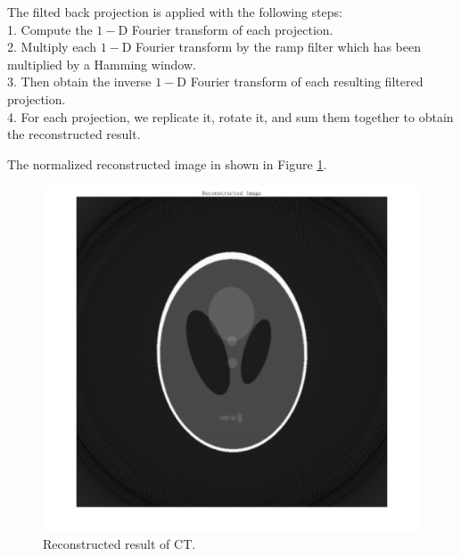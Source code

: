 The filted back projection is applied with the following steps: \\
1. Compute the $1-$D Fourier transform of each projection. \\
2. Multiply each $1-$D Fourier transform by the ramp filter which has been multiplied by a Hamming window. \\
3. Then obtain the inverse $1-$D Fourier transform of each resulting filtered projection. \\
4. For each projection, we replicate it, rotate it, and sum them together to obtain the reconstructed result. 

The normalized reconstructed image in shown in Figure \ref{fig:p1}.

\begin{figure}[htbp]
    \centering
	\includegraphics[width=\textwidth]{../images/p1/p1.png}
    \caption{Reconstructed result of CT.}
    \label{fig:p1}
\end{figure}

\newpage